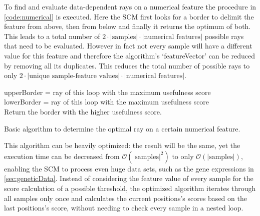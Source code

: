 To find and evaluate data-dependent rays on a numerical feature the procedure in \autoref{code:numerical} is executed.
Here the SCM first looks for a border to delimit the feature from above, then from below and finally it returns the optimum of both.
This leads to a total number of \(2 \cdot |\text{samples}| \cdot |\text{numerical features}|\) possible rays that need to be evaluated.
However in fact not every sample will have a different value for this feature and therefore
the algorithm's `featureVector' can be reduced by removing all its duplicates.
This reduces the total number of possible rays to only \(2 \cdot |\text{unique sample-feature values}| \cdot |\text{numerical features}|\).

\begin{algorithm}[ht]
    upperBorder = ray of this loop with the maximum usefulness score \\
    lowerBorder = ray of this loop with the maximum usefulness score \\
    Return the border with the higher usefulness score.
    \caption{Basic algorithm to determine the optimal ray on a certain numerical feature.}\label{code:numerical}
\end{algorithm}

This algorithm can be heavily optimized: the result will be the same, yet the execution time can be
decreased from \(\mathcal{O}(|\text{samples}|^2)\) to only \(\mathcal{O}(|\text{samples}|)\),
enabling the SCM to process even huge data sets, such as the gene expressions in \autoref{sec:geneticData}.
Instead of considering the feature value of every sample for the score calculation of a possible threshold,
the optimized algorithm iterates through all samples only once and calculates the current positions's scores based
on the last positions's score, without needing to check every sample in a nested loop.

